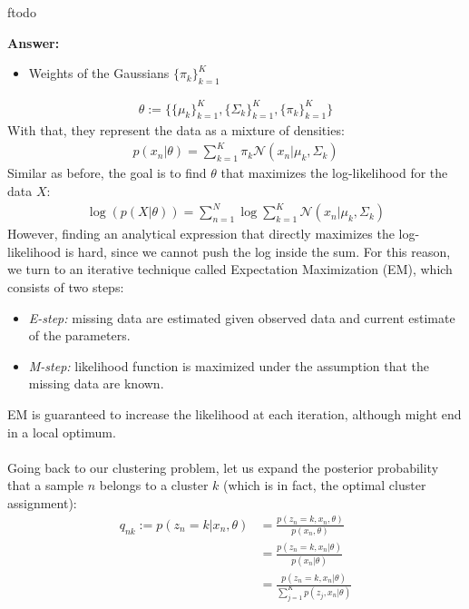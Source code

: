 ƒtodo\documentclass{article}
\newenvironment{QandA}{\begin{enumerate}[label=\arabic*.]}{\end{enumerate}}
\newenvironment{InnerQandA}{\begin{enumerate}[label=\roman*.]}{\end{enumerate}}
\newenvironment{answer}{\par\normalfont \textbf{Answer:}}{}
\newcommand{\g}{\vert}
\begin{document}
\begin{QandA}
\begin{InnerQandA}
\begin{answer}
\begin{itemize}
                \item Weights of the Gaussians $\{\pi_k\}_{k=1}^K$
            \end{itemize}
            \begin{align*}
                \theta := \{\{\mu_k\}_{k=1}^K, \{\Sigma_k\}_{k=1}^K, \{\pi_k\}_{k=1}^K\}
            \end{align*}
            With that, they represent the data as a mixture of densities:
            \begin{align*}
                p(x_n \g \theta) = \sum_{k=1}^K \pi_k \mathcal{N} (x_n \g \mu_k, \Sigma_k)
            \end{align*}
            Similar as before, the goal is to find $\theta$ that maximizes the log-likelihood for the data $X$:
            \begin{align*}
                \log(p(X \g \theta)) = \sum_{n=1}^N \log \sum_{k=1}^K \mathcal{N} (x_n \g \mu_k, \Sigma_k)
            \end{align*}
            However, finding an analytical expression that directly maximizes the log-likelihood is hard, since we cannot push the log inside the sum. For this reason, we turn to an iterative technique called Expectation Maximization (EM), which consists of two steps:
            \begin{itemize}
                \item \textit{E-step:} missing data are estimated given observed data and current estimate of the parameters.
                \item \textit{M-step:} likelihood function is maximized under the assumption that the missing data are known.
            \end{itemize}
            EM is guaranteed to increase the likelihood at each iteration, although might end in a local optimum.\\\\
            Going back to our clustering problem, let us expand the posterior probability that a sample $n$ belongs to a cluster $k$ (which is in fact, the optimal cluster assignment):
            \begin{align*}
                q_{nk} := p(z_n = k \g x_n, \theta) &= \frac{p(z_n = k, x_n, \theta)}{p(x_n, \theta)} \\
                &= \frac{p(z_n = k, x_n \g \theta)}{p(x_n \g \theta)} \\
                &= \frac{p(z_n = k, x_n \g \theta)}{\sum_{j=1}^K p(z_j, x_n \g \theta)} \\

\end{align*}
\end{answer}
\end{InnerQandA}
\end{QandA}
\end{document}

